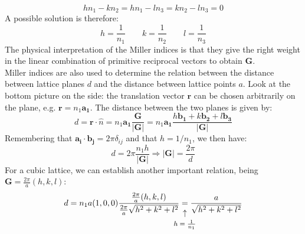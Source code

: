 \documentclass[10.75pt,a4paper,openright,bottom=2cm]{article}
\renewcommand{\Vec}[1]{\boldsymbol{#1}}
\begin{document}
\[
hn_1-kn_2=hn_1-ln_3=kn_2-ln_3=0
\]
A possible solution is therefore:
\[
h=\frac{1}{n_1} \qquad k=\frac{1}{n_2} \qquad l=\frac{1}{n_3}
\]
The physical interpretation of the Miller indices is that they give the right weight in the linear combination of primitive reciprocal vectors to obtain $\Vec{G}$.\\
Miller indices are also used to determine the relation between the distance between lattice planes $d$ and the distance between lattice points $a$. Look at the bottom picture on the side: the translation vector $\Vec{r}$ can be chosen arbitrarily on the plane, e.g. $\Vec{r}=n_1\Vec{a_1}$. The distance between the two planes is given by:
\[
d=\Vec{r}\cdot\hat{n}=n_1\Vec{a_1}\frac{\Vec{G}}{|\Vec{G}|}=n_1\Vec{a_1}\frac{h\Vec{b_1}+k\Vec{b_2}+l\Vec{b_3}}{|\Vec{G}|}
\]
Remembering that $\Vec{a_i}\cdot\Vec{b_j}=2\pi\delta_{ij}$ and that $h=1/n_1$, we then have:
\[
d=2\pi\frac{n_1h}{|\Vec{G}|}\Rightarrow|\Vec{G}|=\frac{2\pi}{d}
\]
For a cubic lattice, we can establish another important relation, being $\Vec{G}=\frac{2\pi}{a}(h,k,l)$:
\[
d=n_1a(1,0,0)\frac{\frac{2\pi}{a}(h,k,l)}{\frac{2\pi}{a}\sqrt{h^2+k^2+l^2}}\underset{\mathclap{\tikz \node {$\uparrow$} node [below=1ex] {\footnotesize $h=\frac{1}{n_1}$};}}{=}\frac{a}{\sqrt{h^2+k^2+l^2}}
\]

\newpage
\end{document}
